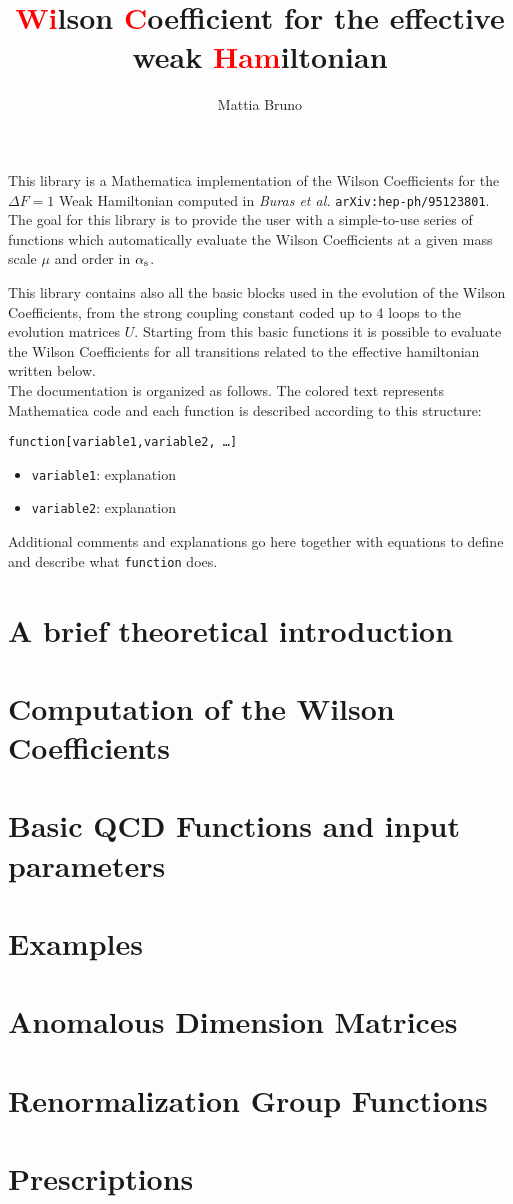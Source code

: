 \documentclass[a4paper]{scrartcl}
\title{\textcolor{red}{Wi}lson \textcolor{red}{C}oefficient for the effective weak \textcolor{red}{Ham}iltonian}
\author{Mattia Bruno}
\newcommand{\as}{\alpha_{\rm s}}
\newcommand{\code}[1]{\noindent\textcolor{RedOrange}{\texttt{#1}}}
\begin{document}
\maketitle

This library is a Mathematica implementation of the Wilson Coefficients 
for the $\Delta F=1$ Weak Hamiltonian computed in \textit{Buras et al.} 
\texttt{arXiv:hep-ph/95123801}.
The goal for this library is to provide the user with a simple-to-use 
series of functions which automatically evaluate the Wilson Coefficients 
at a given mass scale $\mu$ and order in $\as$.

This library contains also all the basic blocks used in the evolution of the 
Wilson Coefficients, from the strong coupling constant coded up to 4 loops to the 
evolution matrices $U$. Starting from this basic functions it is possible to 
evaluate the Wilson Coefficients for all transitions related to the effective
hamiltonian written below.\\

The documentation is organized as follows. The colored text represents 
Mathematica code and each function is described according to this structure:

\hrulefill

\code{function[variable1,variable2, \ldots]}\\
\begin{itemize}
\item \code{variable1}: explanation
\item \code{variable2}: explanation
\end{itemize}

Additional comments and explanations go here together with
equations to define and describe what \code{function} does.

\newpage
\section{A brief theoretical introduction}


\newpage
\section{Computation of the Wilson Coefficients}


\newpage
\section{Basic QCD Functions and input parameters}


\newpage
\section{Examples}


\newpage
\section{Anomalous Dimension Matrices}


\section{Renormalization Group Functions}


\section{Prescriptions}

\end{document}
